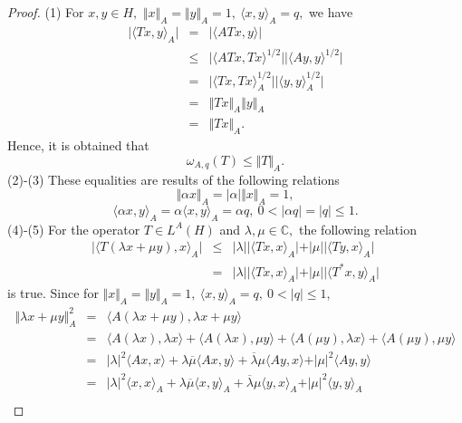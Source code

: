 \documentclass[10pt,a4paper]{amsart}
\begin{document}
\begin{proof}
(1) For $ x, y \in H, $ $ \Vert x \Vert_{A}=\Vert y \Vert_{A}=1, \ \langle x,y \rangle_{A}=q, $ we have 
\begin{eqnarray}
\vert \langle Tx,y \rangle_{A}\vert & = & \vert \langle ATx,y \rangle \vert \nonumber \\
& \leq & \vert \langle ATx,Tx \rangle^{1/2} \vert \vert \langle Ay,y \rangle^{1/2} \vert \nonumber \\
& = & \vert \langle Tx,Tx \rangle_{A}^{1/2} \vert \vert \langle y,y \rangle_{A}^{1/2} \vert \nonumber \\
& = & \Vert Tx \Vert_{A} \Vert y \Vert_{A} \nonumber \\
& = & \Vert Tx \Vert_{A}.  \nonumber
\end{eqnarray}
Hence, it is obtained that
$$
\omega_{A,q}(T)\leq \Vert T \Vert_{A}.
$$
(2)-(3) These equalities are results of the following relations 
$$
\Vert \alpha x \Vert_{A}=\vert \alpha \vert \Vert  x \Vert_{A}=1,
$$
$$
\langle \alpha x,y \rangle_{A}=\alpha \langle x,y \rangle_{A}=\alpha q, \ 0<\vert \alpha q \vert= \vert q \vert \leq 1.
$$
(4)-(5) For the operator $ T\in L^{A}(H) $ and $ \lambda,\mu\in \mathbb{C},$ the following relation
\begin{eqnarray}
\vert \langle T(\lambda x+\mu y),x\rangle_{A} \vert &\leq & \vert \lambda\vert \vert \langle Tx,x\rangle_{A} \vert +  \vert \mu\vert \vert \langle Ty,x\rangle_{A} \vert  \nonumber \\
& = & \vert \lambda\vert \vert \langle Tx,x\rangle_{A} \vert +  \vert \mu\vert \vert \langle T^{*}x,y\rangle_{A} \vert \nonumber
\end{eqnarray}
is true. Since for $ \Vert x \Vert_{A}=\Vert y \Vert_{A}=1, \ \langle x,y\rangle_{A}=q, \ 0<\vert q \vert\leq 1, $ 
\begin{eqnarray}
\Vert \lambda x+\mu y \Vert_{A}^{2} & = & \langle A(\lambda x+\mu y), \lambda x+\mu y \rangle \nonumber \\
& = & \langle A(\lambda x), \lambda x \rangle +\langle A(\lambda x), \mu y \rangle +\langle A(\mu y), \lambda x\rangle + \langle A(\mu y), \mu y \rangle \nonumber \\
& = & \vert \lambda \vert^{2} \langle Ax,  x \rangle + \lambda \overline{\mu} \langle Ax,y \rangle + \overline{\lambda}\mu \langle Ay, x \rangle +\vert \mu \vert^{2} \langle Ay, y \rangle \nonumber \\
& = & \vert \lambda \vert^{2} \langle x,  x \rangle_{A} + \lambda \overline{\mu} \langle x,y \rangle_{A} + \overline{\lambda}\mu \langle y, x \rangle_{A} +\vert \mu \vert^{2} \langle y, y \rangle_{A} \nonumber \\

\end{eqnarray}
\end{proof}
\end{document}
